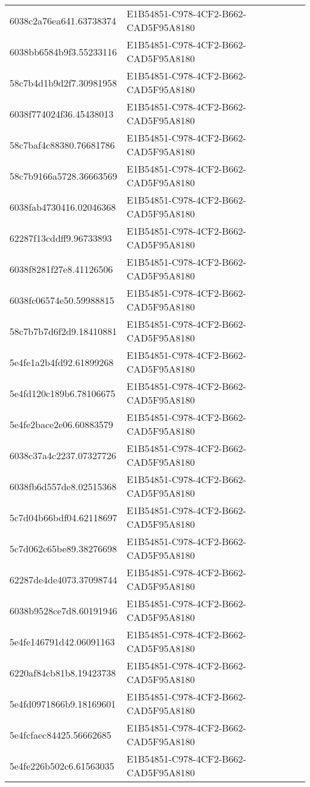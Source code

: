 \begin{tabular}{ll}
6038c2a76ea641.63738374 & E1B54851-C978-4CF2-B662-CAD5F95A8180 \\
6038bb6584b9f3.55233116 & E1B54851-C978-4CF2-B662-CAD5F95A8180 \\
58c7b4d1b9d2f7.30981958 & E1B54851-C978-4CF2-B662-CAD5F95A8180 \\
6038f774024f36.45438013 & E1B54851-C978-4CF2-B662-CAD5F95A8180 \\
58c7baf4c88380.76681786 & E1B54851-C978-4CF2-B662-CAD5F95A8180 \\
58c7b9166a5728.36663569 & E1B54851-C978-4CF2-B662-CAD5F95A8180 \\
6038fab4730416.02046368 & E1B54851-C978-4CF2-B662-CAD5F95A8180 \\
62287f13cddff9.96733893 & E1B54851-C978-4CF2-B662-CAD5F95A8180 \\
6038f8281f27e8.41126506 & E1B54851-C978-4CF2-B662-CAD5F95A8180 \\
6038fc06574e50.59988815 & E1B54851-C978-4CF2-B662-CAD5F95A8180 \\
58c7b7b7d6f2d9.18410881 & E1B54851-C978-4CF2-B662-CAD5F95A8180 \\
5e4fe1a2b4fd92.61899268 & E1B54851-C978-4CF2-B662-CAD5F95A8180 \\
5e4fd120c189b6.78106675 & E1B54851-C978-4CF2-B662-CAD5F95A8180 \\
5e4fe2bace2e06.60883579 & E1B54851-C978-4CF2-B662-CAD5F95A8180 \\
6038c37a4c2237.07327726 & E1B54851-C978-4CF2-B662-CAD5F95A8180 \\
6038fb6d557de8.02515368 & E1B54851-C978-4CF2-B662-CAD5F95A8180 \\
5c7d04b66bdf04.62118697 & E1B54851-C978-4CF2-B662-CAD5F95A8180 \\
5c7d062c65be89.38276698 & E1B54851-C978-4CF2-B662-CAD5F95A8180 \\
62287de4de4073.37098744 & E1B54851-C978-4CF2-B662-CAD5F95A8180 \\
6038b9528ce7d8.60191946 & E1B54851-C978-4CF2-B662-CAD5F95A8180 \\
5e4fe146791d42.06091163 & E1B54851-C978-4CF2-B662-CAD5F95A8180 \\
6220af84cb81b8.19423738 & E1B54851-C978-4CF2-B662-CAD5F95A8180 \\
5e4fd0971866b9.18169601 & E1B54851-C978-4CF2-B662-CAD5F95A8180 \\
5e4fcfaec84425.56662685 & E1B54851-C978-4CF2-B662-CAD5F95A8180 \\
5e4fe226b502c6.61563035 & E1B54851-C978-4CF2-B662-CAD5F95A8180 \\

\end{tabular}
